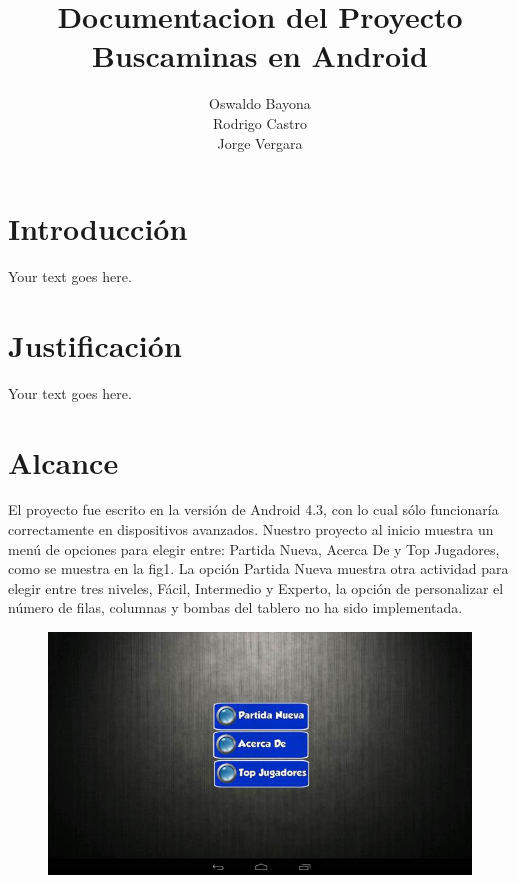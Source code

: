 \documentclass[11pt]{article} %
\title{Documentacion del Proyecto Buscaminas en Android}
\author{Oswaldo Bayona\\Rodrigo Castro\\Jorge Vergara}
\begin{document}
\maketitle

\section{Introducción}

Your text goes here.

\section{Justificación}

Your text goes here.

\section{Alcance}

El proyecto fue escrito en la versión de Android 4.3, con lo cual sólo funcionaría correctamente en dispositivos avanzados.
Nuestro proyecto al inicio  muestra un menú de opciones para elegir entre: Partida Nueva, Acerca De y Top Jugadores, como se muestra en la fig1. La opción Partida Nueva muestra otra actividad para elegir entre tres niveles, Fácil, Intermedio y Experto, la opción de personalizar el número de filas, columnas y bombas del tablero no ha sido implementada. 

\begin{figure}[H]
 \begin{center}
    \includegraphics{imagenes_Documentacion/fig1}
\end{center}
\caption {}
\label{Figura 1}
\end{figure}
\end{document}
